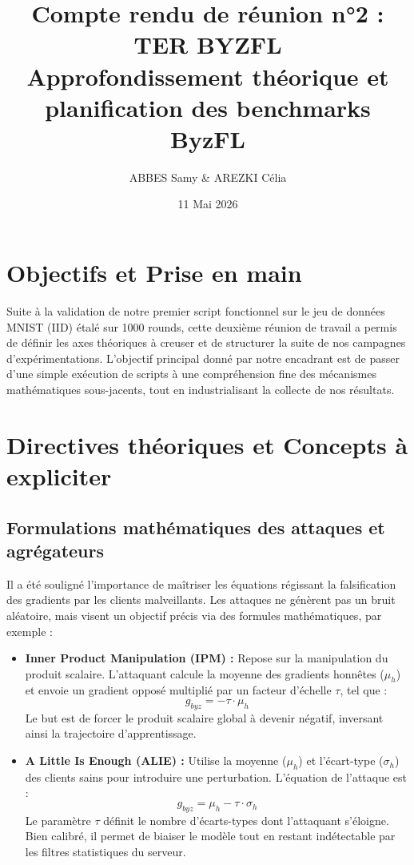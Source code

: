 \documentclass[11pt, a4paper]{article}
\title{\textbf{Compte rendu de réunion n°2 : TER BYZFL} \\ \large Approfondissement théorique et planification des benchmarks ByzFL}
\author{ABBES Samy \& AREZKI Célia}
\date{11 Mai 2026}
\begin{document}
\maketitle

\section{Objectifs et Prise en main}
Suite à la validation de notre premier script fonctionnel sur le jeu de données MNIST (IID) étalé sur 1000 rounds, cette deuxième réunion de travail a permis de définir les axes théoriques à creuser et de structurer la suite de nos campagnes d'expérimentations. L'objectif principal donné par notre encadrant est de passer d'une simple exécution de scripts à une compréhension fine des mécanismes mathématiques sous-jacents, tout en industrialisant la collecte de nos résultats.

\section{Directives théoriques et Concepts à expliciter}

\subsection{Formulations mathématiques des attaques et agrégateurs}
Il a été souligné l'importance de maîtriser les équations régissant la falsification des gradients par les clients malveillants. Les attaques ne génèrent pas un bruit aléatoire, mais visent un objectif précis via des formules mathématiques, par exemple :
\begin{itemize}
    \item \textbf{Inner Product Manipulation (IPM) :} Repose sur la manipulation du produit scalaire. L'attaquant calcule la moyenne des gradients honnêtes ($\mu_h$) et envoie un gradient opposé multiplié par un facteur d'échelle $\tau$, tel que :
    $$g_{byz} = - \tau \cdot \mu_h$$
    Le but est de forcer le produit scalaire global à devenir négatif, inversant ainsi la trajectoire d'apprentissage.
    
    \item \textbf{A Little Is Enough (ALIE) :} Utilise la moyenne ($\mu_h$) et l'écart-type ($\sigma_h$) des clients sains pour introduire une perturbation. L'équation de l'attaque est :
    $$g_{byz} = \mu_h - \tau \cdot \sigma_h$$
    Le paramètre $\tau$ définit le nombre d'écarts-types dont l'attaquant s'éloigne. Bien calibré, il permet de biaiser le modèle tout en restant indétectable par les filtres statistiques du serveur.
\end{itemize}
\end{document}
